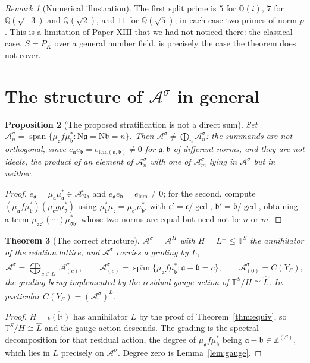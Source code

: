 \documentclass[11pt]{amsart}
\numberwithin{equation}{section}
\newtheorem{theorem}{Theorem}[section]
\newtheorem{proposition}[theorem]{Proposition}
\theoremstyle{definition}
\theoremstyle{remark}
\newtheorem{remark}[theorem]{Remark}
\newcommand{\Z}{\mathbb{Z}}
\newcommand{\Q}{\mathbb{Q}}
\newcommand{\R}{\mathbb{R}}
\newcommand{\T}{\mathbb{T}}
\newcommand{\cA}{\mathcal{A}}
\newcommand{\aaa}{\mathfrak{a}}
\newcommand{\bb}{\mathfrak{b}}
\newcommand{\cc}{\mathfrak{c}}
\newcommand{\dd}{\mathfrak{d}}
\newcommand{\Ns}{\mathrm{N}}
\newcommand{\spn}{\operatorname{span}}
\begin{document}
\begin{remark}[Numerical illustration]\label{rem:num}
The first split prime is $5$ for $\Q(i)$, $7$ for $\Q(\sqrt{-3})$ and $\Q(\sqrt2)$, and $11$
for $\Q(\sqrt5)$; in each case two primes of norm $p$. This is a limitation of Paper XIII
that we had not noticed there: the classical case, $S=P_K$ over a general
number field, is precisely the case the theorem does not cover.
\end{remark}

\section{The structure of $\cA^\sigma$ in general}

\begin{proposition}[The proposed stratification is not a direct sum]\label{prop:notsum}
Set $\cA_n^\sigma=\overline{\spn}\{\mu_\aaa f\mu_\bb^*:\Ns\aaa=\Ns\bb=n\}$. Then
$\cA^\sigma\ne\bigoplus_n\cA_n^\sigma$: the summands are not orthogonal, since
$e_\aaa e_\bb=e_{\mathrm{lcm}(\aaa,\bb)}\ne0$ for $\aaa,\bb$ of different norms, and they are
not ideals, the product of an element of $\cA_n^\sigma$ with one of $\cA_m^\sigma$ lying in
$\cA^\sigma$ but in neither.
\end{proposition}

\begin{proof}
$e_\aaa=\mu_\aaa\mu_\aaa^*\in\cA^\sigma_{\Ns\aaa}$ and $e_\aaa e_\bb=e_{\mathrm{lcm}}\ne0$;
for the second, compute
$(\mu_\aaa f\mu_\bb^*)(\mu_\cc g\mu_\dd^*)$ using $\mu_\bb^*\mu_\cc=\mu_{\cc'}\mu_{\bb'}^*$
with $\cc'=\cc/\gcd$, $\bb'=\bb/\gcd$, obtaining a term
$\mu_{\aaa\cc'}(\cdots)\mu_{\dd\bb'}^*$ whose two norms are equal but need not be $n$ or $m$.
\end{proof}

\begin{theorem}[The correct structure]\label{thm:structure}
$\cA^\sigma=\cA^{H}$ with $H=L^\perp\le\T^S$ the annihilator of the relation lattice, and
$\cA^\sigma$ carries a grading by $L$,
\[
\cA^\sigma=\overline{\bigoplus_{c\in L}}\ \cA^\sigma_{(c)},
\qquad
\cA^\sigma_{(c)}=\overline{\spn}\bigl\{\mu_\aaa f\mu_\bb^*:\aaa-\bb=c\bigr\},
\qquad
\cA^\sigma_{(0)}=C(Y_S),
\]
the grading being implemented by the residual gauge action of
$\T^S/H\cong\widehat L$. In particular $C(Y_S)=(\cA^\sigma)^{\widehat L}$.
\end{theorem}

\begin{proof}
$H=\overline{\iota(\R)}$ has annihilator $L$ by the proof of Theorem~\ref{thm:equiv}, so
$\T^S/H\cong\widehat L$ and the gauge action descends. The grading is the spectral
decomposition for that residual action, the degree of $\mu_\aaa f\mu_\bb^*$ being
$\aaa-\bb\in\Z^{(S)}$, which lies in $L$ precisely on $\cA^\sigma$. Degree zero is
Lemma~\ref{lem:gauge}.
\end{proof}
\end{document}

